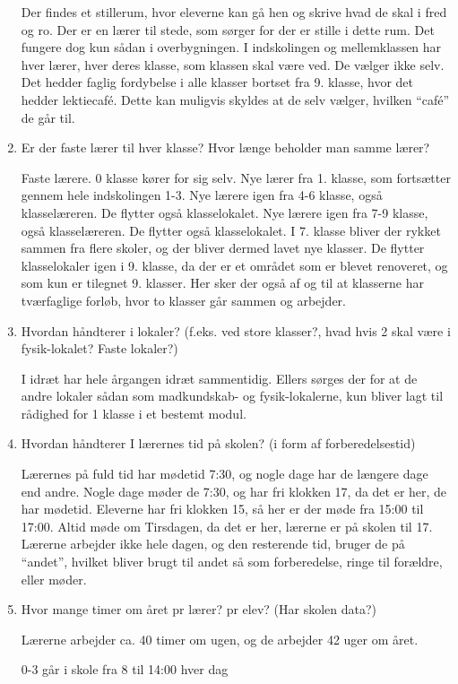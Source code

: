 \begin{enumerate}
	Der findes et stillerum, hvor eleverne kan gå hen og skrive hvad de skal i fred og ro. Der er en lærer til stede, som sørger for der er stille i dette rum.
	Det fungere dog kun sådan i overbygningen. I indskolingen og mellemklassen har hver lærer, hver deres klasse, som klassen skal være ved. De vælger ikke selv.
	Det hedder faglig fordybelse i alle klasser bortset fra 9. klasse, hvor det hedder lektiecafé. Dette kan muligvis skyldes at de selv vælger, hvilken ``café'' de går til.
	\item Er der faste lærer til hver klasse? Hvor længe beholder man samme lærer?
	
	Faste lærere.
	0 klasse kører for sig selv.
	Nye lærer fra 1. klasse, som fortsætter gennem hele indskolingen 1-3.
	Nye lærere igen fra 4-6 klasse, også klasselæreren. De flytter også klasselokalet.
	Nye lærere igen fra 7-9 klasse, også klasselæreren. De flytter også klasselokalet. I 7. klasse bliver der rykket sammen fra flere skoler, og der bliver dermed lavet nye klasser. De flytter klasselokaler igen i 9. klasse, da der er et området som er blevet renoveret, og som kun er tilegnet 9. klasser. Her sker der også af og til at klasserne har tværfaglige forløb, hvor to klasser går sammen og arbejder.
	\item Hvordan håndterer i lokaler? (f.eks. ved store klasser?, hvad hvis 2 skal være i fysik-lokalet? Faste lokaler?)
	
	I idræt har hele årgangen idræt sammentidig. Ellers sørges der for at de andre lokaler sådan som madkundskab- og fysik-lokalerne, kun bliver lagt til rådighed for 1 klasse i et bestemt modul.
	\item Hvordan håndterer I lærernes tid på skolen? (i form af forberedelsestid)
	
	Lærernes på fuld tid har mødetid 7:30, og nogle dage har de længere dage end andre. Nogle dage møder de 7:30, og har fri klokken 17, da det er her, de har mødetid. Eleverne har fri klokken 15, så her er der møde fra 15:00 til 17:00. Altid møde om Tirsdagen, da det er her, lærerne er på skolen til 17. Lærerne arbejder ikke hele dagen, og den resterende tid, bruger de på ``andet'', hvilket bliver brugt til andet så som forberedelse, ringe til forældre, eller møder.
	\item Hvor mange timer om året pr lærer? pr elev? (Har skolen data?)
	
	Lærerne arbejder ca. 40 timer om ugen, og de arbejder 42 uger om året.
	
	0-3 går i skole fra 8 til 14:00 hver dag
	

\end{enumerate}
